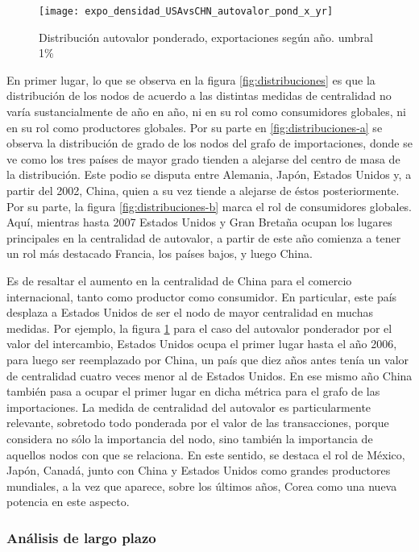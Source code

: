 \documentclass[class=article, crop=false]{standalone}
\begin{document}
\begin{figure}
	\centering		\texttt{[image: expo\_densidad\_USAvsCHN\_autovalor\_pond\_x\_yr]}
	\caption{Distribución autovalor ponderado, exportaciones según año. umbral 1\%}
	\label{fig:distribuciones-c}
\end{figure}




En primer lugar, lo que se observa en la figura \ref{fig:distribuciones} es que la distribución de los nodos de acuerdo a las distintas medidas de centralidad no varía sustancialmente de año en año, ni en su rol como consumidores globales, ni en su rol como productores globales. Por su parte en \ref{fig:distribuciones-a} se observa la distribución de grado de los nodos del grafo de importaciones, donde se ve como los tres países de mayor grado tienden a alejarse del centro de masa de la distribución. Este podio se disputa entre Alemania, Japón, Estados Unidos y, a partir del 2002, China, quien a su vez tiende a alejarse de éstos posteriormente. Por su parte, la figura \ref{fig:distribuciones-b} marca el rol de consumidores globales. Aquí, mientras hasta 2007 Estados Unidos y Gran Bretaña ocupan los lugares principales en la centralidad de autovalor, a partir de este año comienza a tener un rol más destacado Francia, los países bajos, y luego China.      

Es de resaltar el aumento en la centralidad de China para el comercio internacional, tanto como productor como consumidor. En particular, este país desplaza a Estados Unidos de ser el nodo de mayor centralidad en muchas medidas. Por ejemplo, la figura \ref{fig:distribuciones-c} para el caso del autovalor ponderador por el valor del intercambio, Estados Unidos ocupa el primer lugar hasta el año 2006, para luego ser reemplazado por China, un país que diez años antes tenía un valor de centralidad cuatro veces menor al de Estados Unidos. En ese mismo año China también pasa a ocupar el primer lugar en dicha métrica para el grafo de las importaciones. La medida de centralidad del autovalor es particularmente relevante, sobretodo todo ponderada por el valor de las transacciones, porque considera no sólo la importancia del nodo, sino también la importancia de aquellos nodos con que se relaciona. En este sentido, se destaca el rol de México, Japón, Canadá, junto con China y Estados Unidos como grandes productores mundiales, a la vez que aparece, sobre los últimos años, Corea como una nueva potencia en este aspecto.  

\subsubsection{Análisis de largo plazo}
\end{document}
